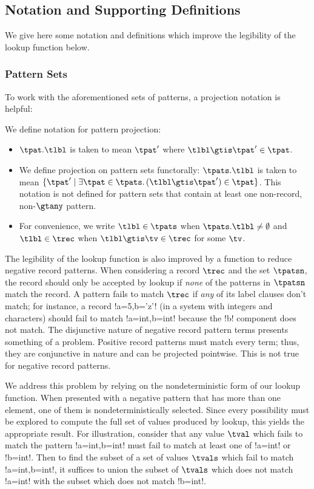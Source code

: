 \documentclass[nocopyright]{sigplanconf}
\begin{document}
\subsection{Notation and Supporting Definitions}

We give here some notation and definitions which improve the legibility of the lookup function below.

\subsubsection{Pattern Sets}

To work with the aforementioned sets of patterns, a projection notation is helpful:

\begin{notation}
    We define notation for pattern projection:
    \begin{itemize}
        \item $\tpat.\tlbl$ is taken to mean $\tpat'$ where $\tlbl \gtis \tpat' \in \tpat$.
        \item We define projection on pattern sets functorally: $\tpats.\tlbl$ is taken to mean $\{\tpat' \mid \exists \tpat \in \tpats.\, (\tlbl \gtis \tpat') \in \tpat\}$.  This notation is not defined for pattern sets that contain at least one non-record, non-$\gtany$ pattern.
        \item For convenience, we write $\tlbl \in \tpats$ when $\tpats.\tlbl \neq \emptyset$ and $\tlbl \in \trec$ when $\tlbl \gtis \tv \in \trec$ for some $\tv$.
    \end{itemize}
\end{notation}

The legibility of the lookup function is also improved by a function to reduce negative record patterns.  When considering a record $\trec$ and the set $\tpatsn$, the record should only be accepted by lookup if \emph{none} of the patterns in $\tpatsn$ match the record.  A pattern fails to match $\trec$ if \emph{any} of its label clauses don't match; for instance, a record \plangil!{a=5,b='z'}! (in a system with integers and characters) should fail to match \plangil!{a=int,b=int}! because the \plangil!b! component does not match.  The disjunctive nature of negative record pattern terms presents something of a problem.  Positive record patterns must match every term; thus, they are conjunctive in nature and can be projected pointwise.  This is not true for negative record patterns.

We address this problem by relying on the nondeterministic form of our lookup function.  When presented with a negative pattern that has more than one element, one of them is nondeterministically selected.  Since every possibility must be explored to compute the full set of values produced by lookup, this yields the appropriate result.  For illustration, consider that any value $\tval$ which fails to match the pattern \plangil!{a=int,b=int}! must fail to match at least one of \plangil!{a=int}! or \plangil!{b=int}!.  Then to find the subset of a set of values $\tvals$ which fail to match \plangil!{a=int,b=int}!, it suffices to union the subset of $\tvals$ which does not match \plangil!{a=int}! with the subset which does not match \plangil!{b=int}!.
\end{document}
